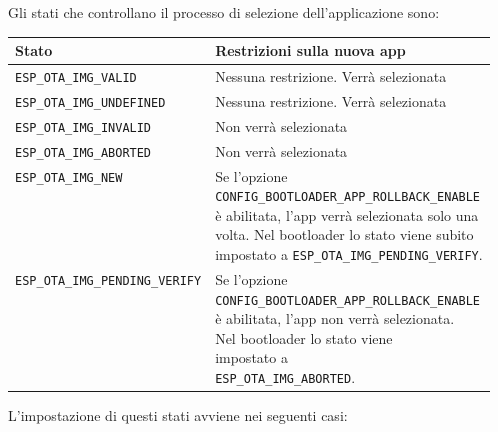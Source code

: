 \documentclass[a4paper]{article}
\begin{document}
\vspace{1em}
\noindent
Gli stati che controllano il processo di selezione dell'applicazione sono:
\begin{table}[H]
  \centering
  \begin{tabular}{|l|l|}
    \hline
    \textbf{Stato} & \textbf{Restrizioni sulla nuova app} \\
    \hline
    \texttt{ESP\_OTA\_IMG\_VALID} & Nessuna restrizione. Verrà selezionata \\
    \hline
    \texttt{ESP\_OTA\_IMG\_UNDEFINED} & Nessuna restrizione. Verrà selezionata \\
    \hline
    \texttt{ESP\_OTA\_IMG\_INVALID} & Non verrà selezionata \\
    \hline
    \texttt{ESP\_OTA\_IMG\_ABORTED} & Non verrà selezionata \\
    \hline
    \texttt{ESP\_OTA\_IMG\_NEW} & \makecell[l]{Se l'opzione \\
    \texttt{CONFIG\_BOOTLOADER\_APP\_ROLLBACK\_ENABLE} \\
    è abilitata, l'app verrà selezionata solo una \\
    volta. Nel bootloader lo stato viene subito \\
    impostato a \texttt{ESP\_OTA\_IMG\_PENDING\_VERIFY}.} \\
    \hline
      \texttt{ESP\_OTA\_IMG\_PENDING\_VERIFY} & \makecell[l]{Se l'opzione \\
    \texttt{CONFIG\_BOOTLOADER\_APP\_ROLLBACK\_ENABLE} \\
    è abilitata, l'app non verrà selezionata. \\
    Nel bootloader lo stato viene \\
    impostato a \\
    \texttt{ESP\_OTA\_IMG\_ABORTED}.} \\
    \hline
  \end{tabular}
\end{table}
\noindent
L'impostazione di questi stati avviene nei seguenti casi:
\end{document}
